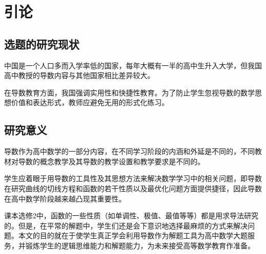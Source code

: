 \chapter{引论}

\section{选题的研究现状}

中国是一个人口多而入学率低的国家，每年大概有一半的高中生升入大学，但我国高中教授的导数内容与其他国家相比差异较大。

在导数教育方面，我国强调实用性和快捷性教育。为了防止学生忽视导数的数学思想价值和表达形式，教师应避免无用的形式化练习。 



\section{研究意义}

导数作为高中数学的一部分内容，在不同学习阶段的内涵和外延是不同的，不同教材对导数的概念教学及其导数的教学设置和教学要求是不同的。

学生应着眼于用导数的工具性及其思想方法来解决数学学习中的相关问题，即导数在研究曲线的切线方程和函数的若干性质以及最优化问题方面提供捷径，因此导数在高中数学阶段越来越凸现其重要性。

课本选修2中，函数的一些性质（如单调性、极值、最值等等）都是用求导法研究的。但是，在平常的解题中，学生们还是会下意识地选择最麻烦的方式来解决问题。本文的目的就在于使学生真正学会利用导数作为解题工具为高中数学大题服务，并锻炼学生的逻辑思维能力和解题能力，为未来接受高等数学教育作准备。